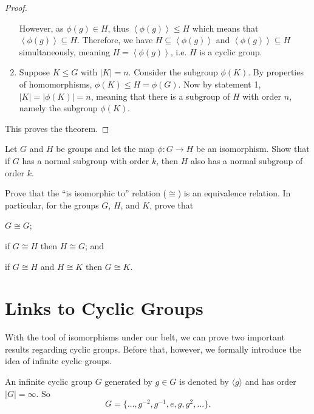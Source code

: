 \begin{proof}
\begin{enumerate}
        However, as $\phi(g) \in H$, thus $\left\langle \phi(g) \right\rangle \leq H$ which means that $\left\langle \phi(g) \right\rangle \subseteq H$. Therefore, we have $H \subseteq \left\langle \phi(g) \right\rangle$ and $\left\langle \phi(g) \right\rangle \subseteq H$ simultaneously, meaning $H = \left\langle \phi(g) \right\rangle$, i.e. $H$ is a cyclic group.

        \item Suppose $K \leq G$ with $|K| = n$. Consider the subgroup $\phi(K)$. By properties of homomorphisms, $\phi(K) \leq H = \phi(G)$. Now by statement 1, $|K| = |\phi(K)| = n$, meaning that there is a subgroup of $H$ with order $n$, namely the subgroup $\phi(K)$.
    \end{enumerate}

    This proves the theorem.
\end{proof}

\begin{exercise}
    Let $G$ and $H$ be groups and let the map $\phi: G \to H$ be an isomorphism. Show that if $G$ has a normal subgroup with order $k$, then $H$ also has a normal subgroup of order $k$.
\end{exercise}

\begin{exercise}
    Prove that the ``is isomorphic to'' relation ($\cong$) is an equivalence relation. In particular, for the groups $G$, $H$, and $K$, prove that
    \begin{partquestions}{\alph*}
        \item $G \cong G$;
        \item if $G \cong H$ then $H \cong G$; and
        \item if $G \cong H$ and $H \cong K$ then $G \cong K$.
    \end{partquestions}
\end{exercise}

\section{Links to Cyclic Groups}
With the tool of isomorphisms under our belt, we can prove two important results regarding cyclic groups. Before that, however, we formally introduce the idea of infinite cyclic groups.
\begin{definition}
    An infinite cyclic group $G$ generated by $g \in G$ is denoted by $\langle g \rangle$ and has order $|G| = \infty$. So
    \[
        G = \{\dots, g^{-2}, g^{-1}, e, g, g^2, \dots\}.
    \]
\end{definition}

